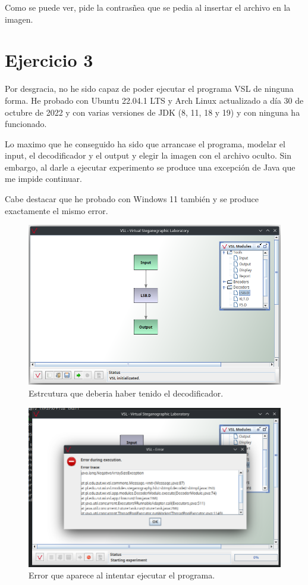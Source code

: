 \documentclass{article}
\begin{document}
Como se puede ver, pide la contrasñea que se pedia al insertar el archivo en la imagen.


\section*{Ejercicio 3}

Por desgracia, no he sido capaz de poder ejecutar el programa VSL de ninguna forma. He probado con Ubuntu 22.04.1 LTS y Arch Linux actualizado a día 30 de octubre de 2022 y con varias versiones de JDK (8, 11, 18 y 19) y con ninguna ha funcionado. 

Lo maximo que he conseguido ha sido que arrancase el programa, modelar el input, el decodificador y el output y elegir la imagen con el archivo oculto. Sin embargo, al darle a ejecutar experimento se produce una excepción de Java que me impide continuar.

Cabe destacar que he probado con Windows 11 también y se produce exactamente el mismo error.

\begin{figure}[H]
    \includegraphics[width=\textwidth]{imagenes/Screenshot_20221030_152701.png}
    \caption{Estrcutura que deberia haber tenido el decodificador.}
\end{figure}

\begin{figure}[H]
    \includegraphics[width=\textwidth]{imagenes/Screenshot_20221030_145831.png}
    \caption{Error que aparece al intentar ejecutar el programa.}
\end{figure}
\end{document}
